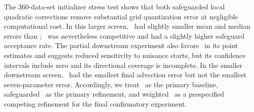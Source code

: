 The 360-data-set initializer stress test shows that both safeguarded local
quadratic corrections remove substantial grid quantization error at negligible
computational cost.  In this larger screen, \Qthree\ had slightly smaller mean
and median errors than \Qfive; \Qfive\ was nevertheless competitive and had a
slightly higher safeguard acceptance rate.  The partial downstream experiment
also favors \Qthree\ in its point estimates and suggests reduced sensitivity to
nuisance starts, but its confidence intervals include zero and its directional
coverage is incomplete.  In the smaller downstream screen, \Qfive\ had the
smallest final advection error but not the smallest seven-parameter error.
Accordingly, we treat \Mthree\ as the primary baseline, safeguarded \Qthree\ as
the primary refinement, and weighted \Qfive\ as a prespecified competing
refinement for the final confirmatory experiment.


